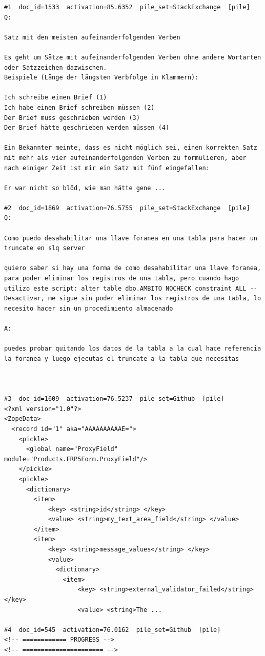 \begin{verbatim}
#1  doc_id=1533  activation=85.6352  pile_set=StackExchange  [pile]
Q:

Satz mit den meisten aufeinanderfolgenden Verben

Es geht um Sätze mit aufeinanderfolgenden Verben ohne andere Wortarten oder Satzzeichen dazwischen.
Beispiele (Länge der längsten Verbfolge in Klammern):

Ich schreibe einen Brief (1)
Ich habe einen Brief schreiben müssen (2)
Der Brief muss geschrieben werden (3)
Der Brief hätte geschrieben werden müssen (4)

Ein Bekannter meinte, dass es nicht möglich sei, einen korrekten Satz mit mehr als vier aufeinanderfolgenden Verben zu formulieren, aber nach einiger Zeit ist mir ein Satz mit fünf eingefallen:

Er war nicht so blöd, wie man hätte gene ...

#2  doc_id=1869  activation=76.5755  pile_set=StackExchange  [pile]
Q:

Como puedo desahabilitar una llave foranea en una tabla para hacer un truncate en slq server

quiero saber si hay una forma de como desahabilitar una llave foranea, para poder eliminar los registros de una tabla, pero cuando hago utilizo este script: alter table dbo.AMBITO NOCHECK constraint ALL --Desactivar, me sigue sin poder eliminar los registros de una tabla, lo necesito hacer sin un procedimiento almacenado 

A:

puedes probar quitando los datos de la tabla a la cual hace referencia la foranea y luego ejecutas el truncate a la tabla que necesitas



#3  doc_id=1609  activation=76.5237  pile_set=Github  [pile]
<?xml version="1.0"?>
<ZopeData>
  <record id="1" aka="AAAAAAAAAAE=">
    <pickle>
      <global name="ProxyField" module="Products.ERP5Form.ProxyField"/>
    </pickle>
    <pickle>
      <dictionary>
        <item>
            <key> <string>id</string> </key>
            <value> <string>my_text_area_field</string> </value>
        </item>
        <item>
            <key> <string>message_values</string> </key>
            <value>
              <dictionary>
                <item>
                    <key> <string>external_validator_failed</string> </key>
                    <value> <string>The ...

#4  doc_id=545  activation=76.0162  pile_set=Github  [pile]
<!-- ============ PROGRESS -->
<!-- ====================== -->


\end{verbatim}
